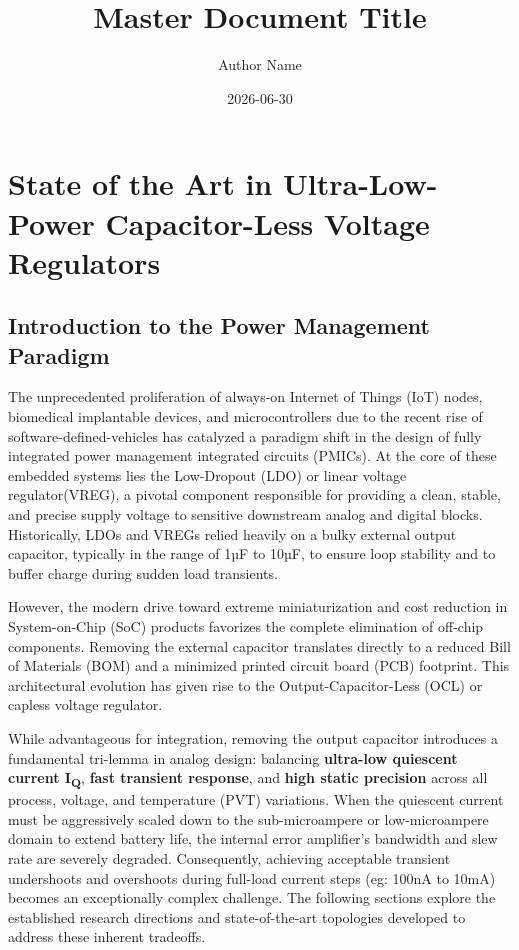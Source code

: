 \documentclass[
]{article}
\title{Master Document Title}
\author{Author Name}
\date{2026-06-30}
\begin{document}
\maketitle

\section{State of the Art in Ultra-Low-Power Capacitor-Less Voltage
Regulators}\label{_state_of_the_art_in_ultra_low_power_capacitor_less_voltage_regulators}

\subsection{Introduction to the Power Management
Paradigm}\label{_introduction_to_the_power_management_paradigm}

The unprecedented proliferation of always-on Internet of Things (IoT)
nodes, biomedical implantable devices, and microcontrollers due to the
recent rise of software-defined-vehicles has catalyzed a paradigm shift
in the design of fully integrated power management integrated circuits
(PMICs). At the core of these embedded systems lies the Low-Dropout
(LDO) or linear voltage regulator(VREG), a pivotal component responsible
for providing a clean, stable, and precise supply voltage to sensitive
downstream analog and digital blocks. Historically, LDOs and VREGs
relied heavily on a bulky external output capacitor, typically in the
range of 1µF to 10µF, to ensure loop stability and to buffer charge
during sudden load transients.

However, the modern drive toward extreme miniaturization and cost
reduction in System-on-Chip (SoC) products favorizes the complete
elimination of off-chip components. Removing the external capacitor
translates directly to a reduced Bill of Materials (BOM) and a minimized
printed circuit board (PCB) footprint. This architectural evolution has
given rise to the Output-Capacitor-Less (OCL) or capless voltage
regulator.

While advantageous for integration, removing the output capacitor
introduces a fundamental tri-lemma in analog design: balancing
\textbf{ultra-low quiescent current I\textsubscript{Q}}, \textbf{fast
transient response}, and \textbf{high static precision} across all
process, voltage, and temperature (PVT) variations. When the quiescent
current must be aggressively scaled down to the sub-microampere or
low-microampere domain to extend battery life, the internal error
amplifier's bandwidth and slew rate are severely degraded. Consequently,
achieving acceptable transient undershoots and overshoots during
full-load current steps (eg: 100nA to 10mA) becomes an exceptionally
complex challenge. The following sections explore the established
research directions and state-of-the-art topologies developed to address
these inherent tradeoffs.
\end{document}
